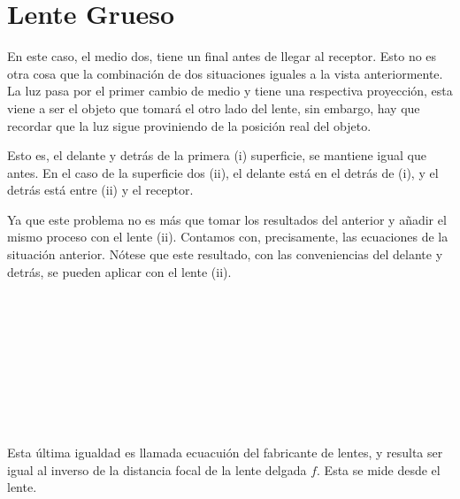 \section{Lente Grueso}



En este caso, el medio dos, tiene un final antes de llegar al receptor.
Esto no es otra cosa que la combinación de dos situaciones iguales a
la vista anteriormente. La luz pasa por el primer cambio de medio y
tiene una respectiva proyección, esta viene a ser el objeto que tomará
el otro lado del lente, sin embargo, hay que recordar que la luz
sigue proviniendo de la posición real del objeto.

Esto es, el delante y detrás de la primera (i) superficie, se mantiene
igual que antes. En el caso de la superficie dos (ii), el delante está
en el detrás de (i), y el detrás está entre (ii) y el receptor.

Ya que este problema no es más que tomar los resultados del anterior y
añadir el mismo proceso con el lente (ii). Contamos con, precisamente,
las ecuaciones de la situación anterior. Nótese que este resultado,
con las conveniencias del delante y detrás, se pueden aplicar con el
lente (ii).

\begin{longderivation}
        \\
    \To\\
        \\
    \equiv\\
            \\
    \\
            \\
    \equiv\\
\end{longderivation}

Esta última igualdad es llamada ecuacuión del fabricante de lentes, y
resulta ser igual al inverso de la distancia focal de la lente delgada $f$.
Esta se mide desde el lente.